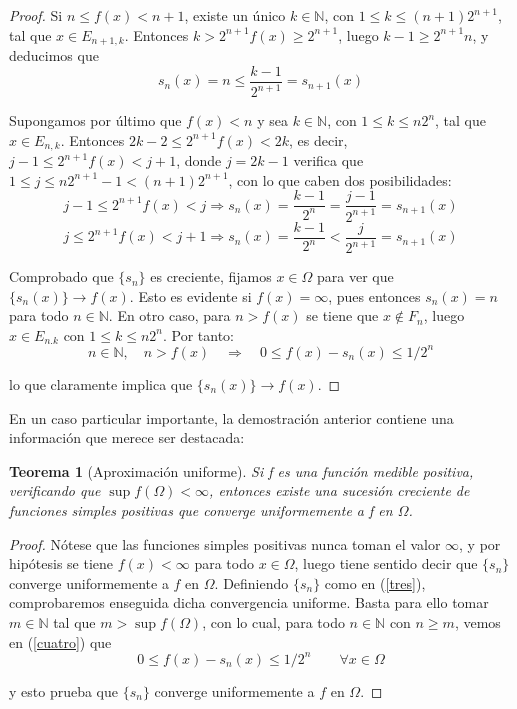 \documentclass[a4paper, 12pt]{article}
\newtheorem*{teorema*}{Teorema}
\begin{document}
\begin{enumerate}[label=\textbf{\arabic*}.]
\begin{proof}
Si \(n \leq f(x) < n + 1\), existe un único \(k \in \mathbb{N}\), con \(1 \leq k \leq (n+1) 2^{n+1}\), tal que \(x \in E_{n+1, k}\). Entonces \(k > 2^{n+1} f(x) \geq 2^{n+1}\), luego \(k - 1 \geq 2^{n+1}n\), y deducimos que
\[
	s_n (x) = n \leq \frac{k-1}{2^{n+1}} = s_{n+1} (x)
\] 

Supongamos por último que \(f(x) < n \) y sea \(k \in \mathbb{N}\), con \(1 \leq k \leq n 2^n\), tal que \(x \in E_{n,k}\). Entonces \(2k -2 \leq 2^{n+1} f(x) < 2k\), es decir, \(j - 1 \leq 2^{n+1} f(x) < j +1\), donde \(j = 2k -1\) verifica que \(1 \leq j \leq n 2^{n+1} - 1 < (n+1) 2^{n+1}\), con lo que caben dos posibilidades:
\[
	j - 1 \leq 2^{n+1} f(x) < j \Longrightarrow s_n (x) = \frac{k-1}{2^n} = \frac{j-1}{2^{n+1}} = s_{n+1} (x)
\]
\[
	j \leq 2^{n+1} f(x) < j + 1 \Longrightarrow s_n (x) = \frac{k-1}{2^n} < \frac{j}{2^{n+1}} = s_{n+1} (x)
\]

Comprobado que \(\{s_n\}\) es creciente, fijamos \(x \in \Omega\) para ver que \(\{s_n (x) \} \to f(x)\). Esto es evidente si \(f(x) = \infty\), pues entonces \(s_n(x) = n\) para todo \(n \in \mathbb{N}\). En otro caso, para \(n > f(x)\) se tiene que \(x \not \in F_n\), luego \(x \in E_{n.k}\) con \(1 \leq k \leq n 2^n\). Por tanto:
\begin{equation}\label{cuatro}
	n \in \mathbb{N}, \quad n > f(x) \quad \Longrightarrow \quad 0 \leq f(x) - s_n(x) \leq 1/2^n
\end{equation}

lo que claramente implica que \(\{s_n(x)\} \to f(x)\).
\end{proof}

En un caso particular importante, la demostración anterior contiene una información que merece ser destacada:

\begin{teorema*}[Aproximación uniforme]
Si f es una función medible positiva, verificando que \(\sup f(\Omega) < \infty\), entonces existe una sucesión creciente de funciones simples positivas que converge uniformemente a f en \(\Omega\).
\end{teorema*}

\begin{proof}
	Nótese que las funciones simples positivas nunca toman el valor \(\infty\), y por hipótesis se tiene \(f(x) < \infty\) para todo \(x \in \Omega\), luego tiene sentido decir que \(\{s_n\}\) converge uniformemente a \(f\) en \(\Omega\). Definiendo \(\{s_n\}\) como en (\ref{tres}), comprobaremos enseguida dicha convergencia uniforme. Basta para ello tomar \(m \in \mathbb{N}\) tal que \(m > \sup f(\Omega)\), con lo cual, para todo \(n \in \mathbb{N}\) con \(n \geq m\), vemos en (\ref{cuatro}) que
	\[
		0 \leq f(x) - s_n (x) \leq 1/2^n \qquad \forall x \in \Omega
	\]
	
	y esto prueba que \(\{s_n\}\) converge uniformemente a \(f\) en \(\Omega\).
\end{proof}

\end{enumerate}
\end{document}
